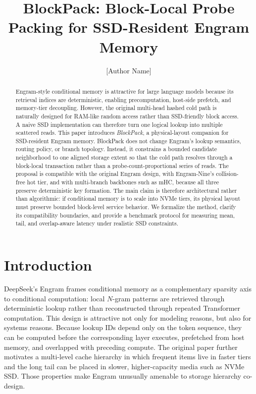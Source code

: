 \documentclass[11pt]{article}
\title{BlockPack: Block-Local Probe Packing for SSD-Resident Engram Memory}
\author{[Author Name]}
\date{}
\begin{document}
\maketitle

\begin{abstract}
Engram-style conditional memory is attractive for large language models because its retrieval indices are deterministic, enabling precomputation, host-side prefetch, and memory-tier decoupling. However, the original multi-head hashed cold path is naturally designed for RAM-like random access rather than SSD-friendly block access. A naive SSD implementation can therefore turn one logical lookup into multiple scattered reads. This paper introduces \emph{BlockPack}, a physical-layout companion for SSD-resident Engram memory. BlockPack does not change Engram's lookup semantics, routing policy, or branch topology. Instead, it constrains a bounded candidate neighborhood to one aligned storage extent so that the cold path resolves through a block-local transaction rather than a probe-count-proportional series of reads. The proposal is compatible with the original Engram design, with Engram-Nine's collision-free hot tier, and with multi-branch backbones such as mHC, because all three preserve deterministic key formation. The main claim is therefore architectural rather than algorithmic: if conditional memory is to scale into NVMe tiers, its physical layout must preserve bounded block-level service behavior. We formalize the method, clarify its compatibility boundaries, and provide a benchmark protocol for measuring mean, tail, and overlap-aware latency under realistic SSD constraints.
\end{abstract}

\section{Introduction}
DeepSeek's Engram frames conditional memory as a complementary sparsity axis to conditional computation: local $N$-gram patterns are retrieved through deterministic lookup rather than reconstructed through repeated Transformer computation. This design is attractive not only for modeling reasons, but also for systems reasons. Because lookup IDs depend only on the token sequence, they can be computed before the corresponding layer executes, prefetched from host memory, and overlapped with preceding compute. The original paper further motivates a multi-level cache hierarchy in which frequent items live in faster tiers and the long tail can be placed in slower, higher-capacity media such as NVMe SSD. Those properties make Engram unusually amenable to storage hierarchy co-design.
\end{document}
